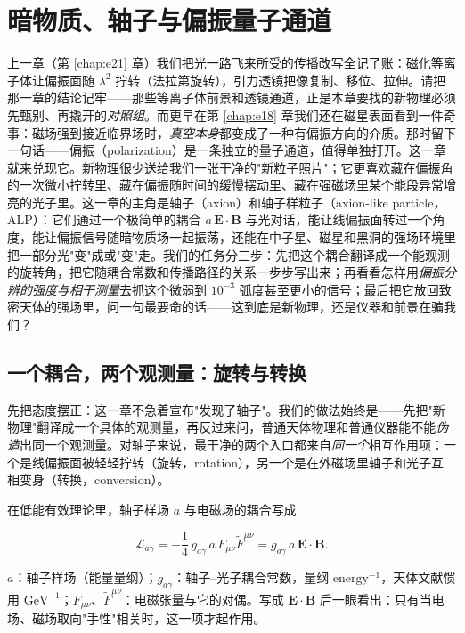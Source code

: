 \chapter{暗物质、轴子与偏振量子通道}
\label{chap:e22}

\begin{chapteropening}
上一章（第 \ref{chap:e21} 章）我们把光一路飞来所受的传播改写全记了账：磁化等离子体让偏振面随 \(\lambda^2\) 拧转（法拉第旋转），引力透镜把像复制、移位、拉伸。请把那一章的结论记牢——那些等离子体前景和透镜通道，正是本章要找的新物理必须先甄别、再撬开的\emph{对照组}。而更早在第 \ref{chap:e18} 章我们还在磁星表面看到一件奇事：磁场强到接近临界场时，\emph{真空本身}都变成了一种有偏振方向的介质。那时留下一句话——偏振（polarization）是一条独立的量子通道，值得单独打开。这一章就来兑现它。新物理很少送给我们一张干净的"新粒子照片"；它更喜欢藏在偏振角的一次微小拧转里、藏在偏振随时间的缓慢摆动里、藏在强磁场里某个能段异常增亮的光子里。这一章的主角是轴子（axion）和轴子样粒子（axion-like particle，ALP）：它们通过一个极简单的耦合 \(a\,\bm E\cdot\bm B\) 与光对话，能让线偏振面转过一个角度，能让偏振信号随暗物质场一起振荡，还能在中子星、磁星和黑洞的强场环境里把一部分光"变"成或"变"走。我们的任务分三步：先把这个耦合翻译成一个能观测的旋转角，把它随耦合常数和传播路径的关系一步步写出来；再看看怎样用\emph{偏振分辨的强度与相干测量}去抓这个微弱到 \(10^{-3}\) 弧度甚至更小的信号；最后把它放回致密天体的强场里，问一句最要命的话——这到底是新物理，还是仪器和前景在骗我们？
\end{chapteropening}


\section{一个耦合，两个观测量：旋转与转换}
\label{sec:e22-coupling}

先把态度摆正：这一章不急着宣布"发现了轴子"。我们的做法始终是——先把"新物理"翻译成一个具体的观测量，再反过来问，普通天体物理和普通仪器能不能\emph{伪造}出同一个观测量。对轴子来说，最干净的两个入口都来自\emph{同一个}相互作用项：一个是线偏振面被轻轻拧转（旋转，rotation），另一个是在外磁场里轴子和光子互相变身（转换，conversion）。

在低能有效理论里，轴子样场 \(a\) 与电磁场的耦合写成

\begin{equation}
  \mathcal L_{a\gamma}
  = -\frac{1}{4}\,g_{a\gamma}\,a\,F_{\mu\nu}\tilde F^{\mu\nu}
  = g_{a\gamma}\,a\,\bm E\cdot\bm B .
  \label{eq:e22-lagrangian}
\end{equation}
\begin{formulaexplain}
\(a\)：轴子样场（能量量纲）；\(g_{a\gamma}\)：轴子--光子耦合常数，量纲 \(\mathrm{energy^{-1}}\)，天体文献惯用 \(\mathrm{GeV^{-1}}\)；\(F_{\mu\nu}\)、\(\tilde F^{\mu\nu}\)：电磁张量与它的对偶。写成 \(\bm E\cdot\bm B\) 后一眼看出：只有当电场、磁场取向"手性"相关时，这一项才起作用。
\end{formulaexplain}

